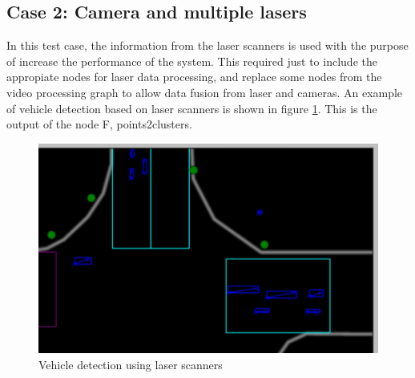 \subsection{Case 2: Camera and multiple lasers}


In this test case, the information from the laser scanners is used with the purpose of increase the performance of the system. This required just to include the appropiate nodes for laser data processing, and replace some nodes from the video processing graph to allow data fusion from laser and cameras. An example of vehicle detection based on laser scanners is shown in figure \ref{laser_detection}. This is the output of the node F, points2clusters.

\begin{figure}[htb!]
\centering
\includegraphics[scale=0.4]{fig/4/laser1a.png}
\caption{Vehicle detection using laser scanners}
\label{laser_detection}
\end{figure}

